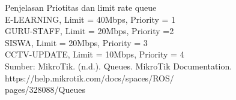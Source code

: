 \begin{enumerate}
	Penjelasan Priotitas dan limit rate queue\\
	E-LEARNING, Limit = 40Mbps, Priority = 1\\
	GURU-STAFF, Limit = 20Mbps, Priority =2\\
	SISWA, Limit = 20Mbps, Priority = 3\\
	CCTV-UPDATE, Limit = 10Mbps, Priority = 4\\
	Sumber: MikroTik. (n.d.). Queues. MikroTik Documentation. https://help.mikrotik.com/docs/spaces/ROS/\\pages/328088/Queues
\end{enumerate}